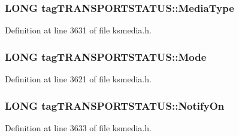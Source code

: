 \subsubsection[{\texorpdfstring{Media\+Type}{MediaType}}]{\setlength{\rightskip}{0pt plus 5cm}L\+O\+NG tag\+T\+R\+A\+N\+S\+P\+O\+R\+T\+S\+T\+A\+T\+U\+S\+::\+Media\+Type}\hypertarget{structtag_t_r_a_n_s_p_o_r_t_s_t_a_t_u_s_a15a4a25dabebcd0bb1b19ab96410cda1}{}\label{structtag_t_r_a_n_s_p_o_r_t_s_t_a_t_u_s_a15a4a25dabebcd0bb1b19ab96410cda1}


Definition at line 3631 of file ksmedia.\+h.

\subsubsection[{\texorpdfstring{Mode}{Mode}}]{\setlength{\rightskip}{0pt plus 5cm}L\+O\+NG tag\+T\+R\+A\+N\+S\+P\+O\+R\+T\+S\+T\+A\+T\+U\+S\+::\+Mode}\hypertarget{structtag_t_r_a_n_s_p_o_r_t_s_t_a_t_u_s_ad9ba589f66c7933ebba5c2ba9c3fe8dd}{}\label{structtag_t_r_a_n_s_p_o_r_t_s_t_a_t_u_s_ad9ba589f66c7933ebba5c2ba9c3fe8dd}


Definition at line 3621 of file ksmedia.\+h.

\subsubsection[{\texorpdfstring{Notify\+On}{NotifyOn}}]{\setlength{\rightskip}{0pt plus 5cm}L\+O\+NG tag\+T\+R\+A\+N\+S\+P\+O\+R\+T\+S\+T\+A\+T\+U\+S\+::\+Notify\+On}\hypertarget{structtag_t_r_a_n_s_p_o_r_t_s_t_a_t_u_s_aad35617c1adcf442c2f8a789c8f1d9df}{}\label{structtag_t_r_a_n_s_p_o_r_t_s_t_a_t_u_s_aad35617c1adcf442c2f8a789c8f1d9df}


Definition at line 3633 of file ksmedia.\+h.

